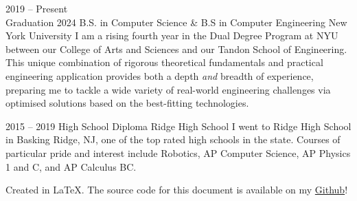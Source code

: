 \documentclass[9pt]{developercv} %
\begin{document}
\begin{entrylist}
	\entry
	{
		2019 -- Present
		\\
		\footnotesize{Graduation 2024}
	}
	{B.S. in Computer Science \& B.S in Computer Engineering}
	{New York University}
	{
		I am a rising fourth year in the Dual Degree Program at NYU between our College of Arts and Sciences and our Tandon School of Engineering.
		This unique combination of rigorous theoretical fundamentals and practical engineering application provides both a depth \textit{and} breadth of experience, preparing me to tackle a wide variety of real-world engineering challenges via optimised solutions based on the best-fitting technologies.
	}

	\entry
	{2015 -- 2019}
	{High School Diploma}
	{Ridge High School}
	{I went to Ridge High School in Basking Ridge, NJ, one of the top rated high schools in the state. Courses of particular pride and interest include Robotics, AP Computer Science, AP Physics 1 and C, and AP Calculus BC.}
\end{entrylist}


\vspace{30pt}
Created in \LaTeX.
The source code for this document is available on my  \href{https://github.com/Cosmic-Goat?tab=repositories}{Github}!
\end{document}
